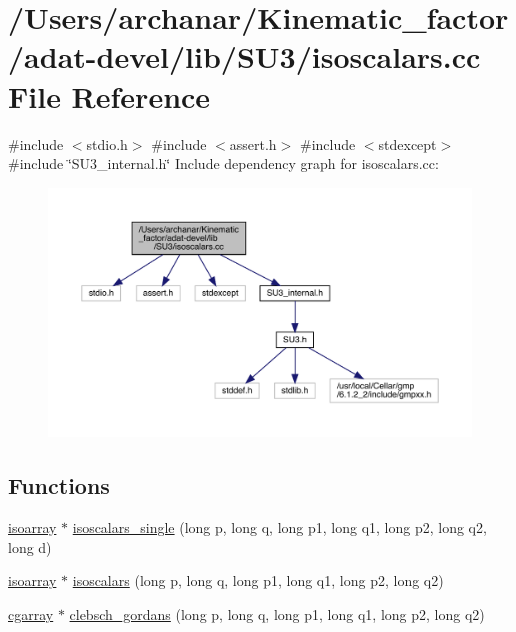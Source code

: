 \hypertarget{adat-devel_2lib_2SU3_2isoscalars_8cc}{}\section{/\+Users/archanar/\+Kinematic\+\_\+factor/adat-\/devel/lib/\+S\+U3/isoscalars.cc File Reference}
\label{adat-devel_2lib_2SU3_2isoscalars_8cc}
{\ttfamily \#include $<$stdio.\+h$>$}\newline
{\ttfamily \#include $<$assert.\+h$>$}\newline
{\ttfamily \#include $<$stdexcept$>$}\newline
{\ttfamily \#include \char`\"{}S\+U3\+\_\+internal.\+h\char`\"{}}\newline
Include dependency graph for isoscalars.\+cc\+:
\nopagebreak
\begin{figure}[H]
\begin{center}
\leavevmode
\includegraphics[width=350pt]{d4/d7e/adat-devel_2lib_2SU3_2isoscalars_8cc__incl}
\end{center}
\end{figure}
\subsection*{Functions}
\begin{DoxyCompactItemize}
\item 
\mbox{\hyperlink{classisoarray}{isoarray}} $\ast$ \mbox{\hyperlink{adat-devel_2lib_2SU3_2isoscalars_8cc_a79b9e82efcee0dcd9db337a918244131}{isoscalars\+\_\+single}} (long p, long q, long p1, long q1, long p2, long q2, long d)
\item 
\mbox{\hyperlink{classisoarray}{isoarray}} $\ast$ \mbox{\hyperlink{adat-devel_2lib_2SU3_2isoscalars_8cc_af6d3c492b2cce16ac0e23e3a625b1039}{isoscalars}} (long p, long q, long p1, long q1, long p2, long q2)
\item 
\mbox{\hyperlink{classcgarray}{cgarray}} $\ast$ \mbox{\hyperlink{adat-devel_2lib_2SU3_2isoscalars_8cc_a0c97c84d594ed0b3d473b2a1285e680e}{clebsch\+\_\+gordans}} (long p, long q, long p1, long q1, long p2, long q2)
\end{DoxyCompactItemize}


